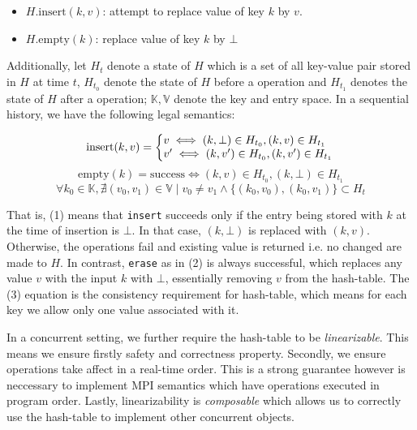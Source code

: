 \begin{itemize}
  \item $H.\text{insert}(k,v)$: attempt to replace value of key $k$ by $v$.
  \item $H.\text{empty}(k)$: replace value of key $k$ by $\bot$
\end{itemize}

Additionally, let $H_t$ denote a state of $H$ which is a set of all key-value
pair stored in $H$ at time $t$, $H_{t_0}$ denote the state of $H$ before a
operation and $H_{t_1}$ denotes the state of $H$ after a operation;
$\mathbb{K}, \mathbb{V}$ denote the key and entry space. In a sequential
history, we have the following legal semantics:

\begin{equation}
  \text{insert}(k, v) = \left\{
    \begin{array}{@{}l@{\thinspace}l}
      v \iff (k,\bot) \in H_{t_0}, (k,v) \in H_{t_1}\\
      v' \iff (k,v') \in H_{t_0}, (k,v') \in H_{t_1}
    \end{array}
    \right.
\end{equation}
\begin{equation}
  \text{empty}(k) = \text{success} \iff  (k,v) \in H_{t_0}, (k,\bot) \in H_{t_1}
\end{equation}
\begin{equation}
  \forall k_0 \in \mathbb{K}, \nexists {(v_0, v_1) \in \mathbb{V}}
  \mid {{v_0 \ne v_1} \wedge \{(k_0, v_0), (k_0, v_1)\} \subset H_{t}}
\end{equation}

That is, (1) means that \texttt{insert} succeeds only if the entry being stored
with $k$ at the time of insertion is $\bot$.  In that case, $(k,\bot)$ is
replaced with $(k, v)$. Otherwise, the operations fail and existing value is
returned i.e. no changed are made to $H$. In contrast, \texttt{erase} as in (2)
is always successful, which replaces any value $v$ with the input $k$ with
$\bot$, essentially removing $v$ from the hash-table. The (3) equation is the
consistency requirement for hash-table, which means for each key we allow
only one value associated with it.

In a concurrent setting, we further require the hash-table to be
\textit{linearizable}.  This means we ensure firstly safety and correctness
property. Secondly, we ensure operations take affect in a real-time order.
This is a strong guarantee however is neccessary to implement MPI semantics
which have operations executed in program order. Lastly, linearizability is
\textit{composable} which allows us to correctly use the hash-table to
implement other concurrent objects.

